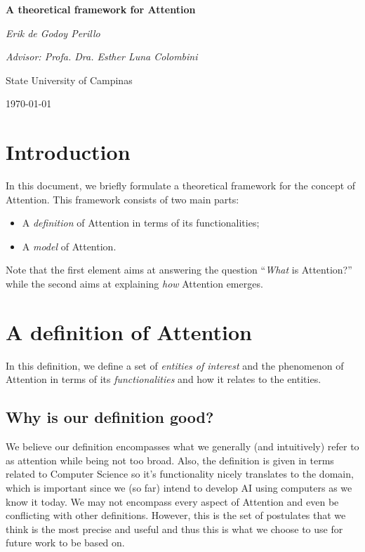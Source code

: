 \documentclass[11pt]{article}
\begin{document}

\begin{titlepage}
	\centering
	{\scshape\Large \par}
	\vspace{3.5cm}
	{\huge\bfseries A theoretical framework for Attention\par}
	\vspace{1cm}
	{\itshape Erik de Godoy Perillo\par}
	{\itshape Advisor: Profa. Dra. Esther Luna Colombini\par}
	\vspace{0.5cm}
	\vfill
	State University of Campinas
	\vfill
	{\large \today\par}
\end{titlepage}

\newpage




\section{Introduction}
In this document, we briefly formulate a theoretical framework for the concept of Attention.
This framework consists of two main parts:
\begin{itemize}
    \item A \emph{definition} of Attention in terms of its functionalities;
    \item A \emph{model} of Attention.
\end{itemize}
Note that the first element aims at answering the question ``\emph{What} is Attention?''
while the second aims at explaining \emph{how} Attention emerges.

\section{A definition of Attention}
\label{sec:definition}
In this definition, we define a set of \emph{entities of interest} and the phenomenon of Attention in terms of
its \emph{functionalities} and how it relates to the entities.

\subsection{Why is our definition good?}
We believe our definition encompasses what we generally (and intuitively) refer to as attention while being not too broad.
Also, the definition is given in terms related to Computer Science so it’s functionality nicely translates to the domain,
which is important since we (so far) intend to develop AI using computers as we know it today.
We may not encompass every aspect of Attention and even be conflicting with other definitions.
However, this is the set of postulates that we think is the most precise and useful and thus this is
what we choose to use for future work to be based on.
\end{document}
